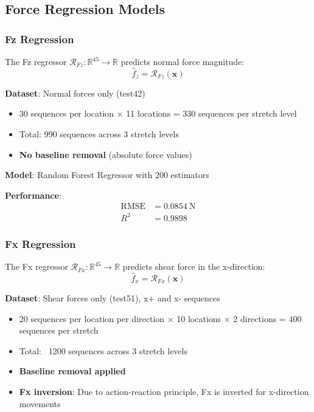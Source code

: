 \documentclass[11pt,a4paper]{article}
\begin{document}
\subsection{Force Regression Models}

\subsubsection{Fz Regression}

The Fz regressor $\mathcal{R}_{Fz}: \mathbb{R}^{45} \rightarrow \mathbb{R}$ predicts normal force magnitude:
\begin{equation}
\hat{f}_z = \mathcal{R}_{Fz}(\mathbf{x})
\end{equation}

\textbf{Dataset}: Normal forces only (test42)
\begin{itemize}
    \item 30 sequences per location × 11 locations = 330 sequences per stretch level
    \item Total: 990 sequences across 3 stretch levels
    \item \textbf{No baseline removal} (absolute force values)
\end{itemize}

\textbf{Model}: Random Forest Regressor with 200 estimators

\textbf{Performance}:
\begin{align}
\text{RMSE} &= \SI{0.0854}{\newton} \\
R^2 &= 0.9898
\end{align}

\subsubsection{Fx Regression}

The Fx regressor $\mathcal{R}_{Fx}: \mathbb{R}^{45} \rightarrow \mathbb{R}$ predicts shear force in the x-direction:
\begin{equation}
\hat{f}_x = \mathcal{R}_{Fx}(\mathbf{x})
\end{equation}

\textbf{Dataset}: Shear forces only (test51), x+ and x- sequences
\begin{itemize}
    \item 20 sequences per location per direction × 10 locations × 2 directions = 400 sequences per stretch
    \item Total: ~1200 sequences across 3 stretch levels
    \item \textbf{Baseline removal applied}
    \item \textbf{Fx inversion}: Due to action-reaction principle, Fx is inverted for x-direction movements
\end{itemize}
\end{document}
